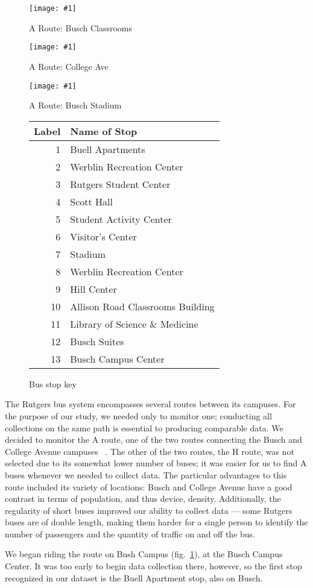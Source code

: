 \documentclass[11pt,journal,compsoc]{IEEEtran} %
\newcommand{\minipic}[3]{
  \begin{figure}[!t]
    \centering
    \texttt{[image: \#1]}
    \caption{#2}
    \label{#3}
  \end{figure}
}
\begin{document}
\minipic{aroutebusch}{A Route: Busch Classrooms} {fig:aroutebusch}
\minipic{aroutecollegeave}{A Route: College Ave}{fig:aroutecollegeave}
\minipic{aroutestadium}{A Route: Busch Stadium}{fig:aroutestadium}

\begin{figure}[!t]
  \centering
  \begin{tabular}{ r|l }
    Label & Name of Stop\\ \hline
    1 & Buell Apartments\\
    2 & Werblin Recreation Center\\
    3 & Rutgers Student Center\\
    4 & Scott Hall\\
    5 & Student Activity Center\\
    6 & Visitor's Center\\
    7 & Stadium\\
    8 & Werblin Recreation Center\\
    9 & Hill Center\\
    10 & Allison Road Classrooms Building\\
    11 & Library of Science \& Medicine\\
    12 & Busch Suites\\
    13 & Busch Campus Center\\
  \end{tabular}
  \caption{Bus stop key}
  \label{fig:stops}
\end{figure}

The Rutgers bus system encompasses several routes between its campuses.
For the purpose of our study, we needed only to monitor one; conducting all collections on the same path is essential to producing comparable data.
We decided to monitor the A route, one of the two routes connecting the Busch and College Avenue campuses ~\cite{busroutes}.
The other of the two routes, the H route, was not selected due to its somewhat lower number of buses; it was easier for us to find A buses whenever we needed to collect data.
The particular advantages to this route included its variety of locations: Busch and College Avenue have a good contrast in terms of population, and thus device, density.
Additionally, the regularity of short buses improved our ability to collect data --- some Rutgers buses are of double length, making them harder for a single person to identify the number of passengers and the quantity of traffic on and off the bus.

We began riding the route on Bush Campus (fig.~\ref{fig:aroutebusch}), at the Busch Campus Center.
It was too early to begin data collection there, however, so the first stop recognized in our dataset is the Buell Apartment stop, also on Busch.
\end{document}

